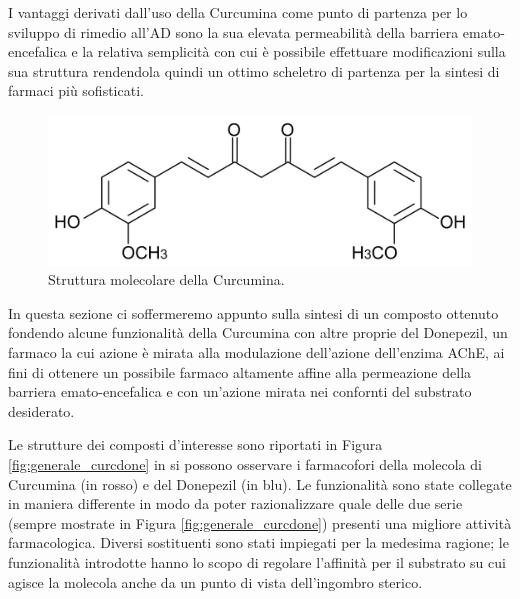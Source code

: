 \documentclass[a4paper, 12pt]{article}
\begin{document}
I vantaggi derivati dall'uso della Curcumina come punto di partenza per lo sviluppo di rimedio all'AD sono la sua elevata permeabilità della barriera emato-encefalica e la relativa semplicità con cui è possibile effettuare modificazioni sulla sua struttura rendendola quindi un ottimo scheletro di partenza per la sintesi di farmaci più sofisticati. \cite{jabir_cholinesterase_2018, jiang_traditional_2017}

\begin{figure}[H]
	\centering
	\includegraphics[width=.6\linewidth]{immagini/curcumina.png}
	\caption{Struttura molecolare della Curcumina.}
	\label{fig:curcumina}
\end{figure}

In questa sezione ci soffermeremo appunto sulla sintesi di un composto ottenuto fondendo alcune funzionalità della Curcumina con altre proprie del Donepezil, un farmaco la cui azione è mirata alla modulazione dell'azione dell'enzima AChE, ai fini di ottenere un possibile farmaco altamente affine alla permeazione della barriera emato-encefalica e con un'azione mirata nei confornti del substrato desiderato.

Le strutture dei composti d'interesse sono riportati in Figura \ref{fig:generale_curcdone} in si possono osservare i farmacofori della molecola di Curcumina (in rosso) e del Donepezil (in blu). Le funzionalità sono state collegate in maniera differente in modo da poter razionalizzare quale delle due serie (sempre mostrate in Figura \ref{fig:generale_curcdone}) presenti una migliore attività farmacologica. Diversi sostituenti sono stati impiegati per la medesima ragione; le funzionalità introdotte hanno lo scopo di regolare l'affinità per il substrato su cui agisce la molecola anche da un punto di vista dell'ingombro sterico.
\end{document}
